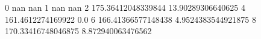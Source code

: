 0 nan nan
1 nan nan
2 175.36412048339844 13.90289306640625
4 161.4612274169922 0.0
6 166.41366577148438 4.9524383544921875
8 170.33416748046875 8.872940063476562
